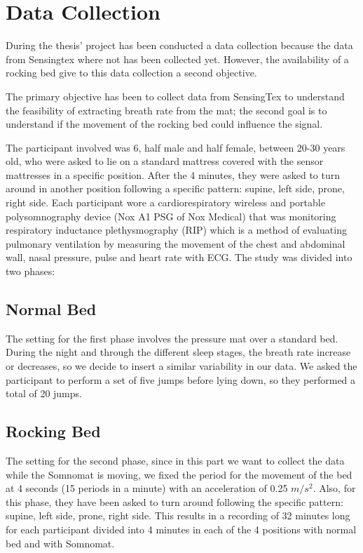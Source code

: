 \section{Data Collection} \label{cap:dataCollection}

During the thesis' project has been conducted a data collection because the data from Sensingtex where not has been collected yet.
However, the availability of a rocking bed give to this data collection a second objective.

The primary objective has been to collect data from SensingTex to understand the feasibility of extracting breath rate from the mat; the second goal is to understand if the movement of the rocking bed could influence the signal.\newline

The participant involved was 6, half male and half female, between 20-30 years old, who were asked to lie on a standard mattress covered with the sensor mattresses in a specific position. 
After the 4 minutes, they were asked to turn around in another position following a specific pattern: supine, left side, prone, right side.
Each participant wore a cardiorespiratory wireless and portable polysomnography device (Nox A1 PSG of Nox Medical) that was
monitoring respiratory inductance plethysmography (RIP) which is a method of evaluating pulmonary ventilation by measuring the movement of the chest and abdominal wall, nasal pressure, pulse and heart rate with ECG. 
The study was divided into two phases:
\subsection{Normal Bed}\label{cap:NormalBed}
The setting for the first phase involves the pressure mat over a standard bed. During the night and through the different sleep stages, the breath rate increase or decreases, so we decide to insert a similar variability in our data. We asked the participant to perform a set of five jumps before lying down, so they performed a total of 20 jumps.
\subsection{Rocking Bed}\label{cap:RockingBed}
The setting for the second phase, since in this part we want to collect the data while the Somnomat is moving, we fixed the period for the movement of the bed at 4 seconds (15 periods in a minute) with an acceleration of 0.25 $m/s^2$. Also, for this phase, they have been asked to turn around following the specific pattern: supine, left side, prone, right side.
This results in a recording of 32 minutes long for each participant divided into 4 minutes in each of the 4 positions with normal bed and with Somnomat.

